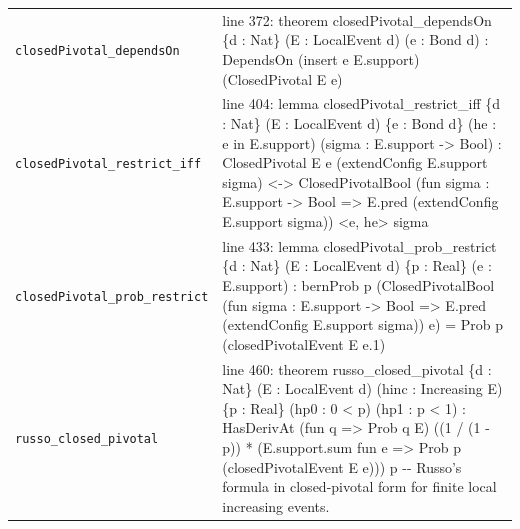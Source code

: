 \documentclass[10pt]{article}
\begin{document}
\begin{longtable}{>{\raggedright\arraybackslash}p{} >{\raggedright\arraybackslash}p{}}
\texttt{closedPivotal\_\allowbreak{}dependsOn} & {\ttfamily\scriptsize line 372:\allowbreak{} theorem closedPivotal\_\allowbreak{}dependsOn \{d :\allowbreak{} Nat\} (\allowbreak{}E :\allowbreak{} LocalEvent d)\allowbreak{} (\allowbreak{}e :\allowbreak{} Bond d)\allowbreak{} :\allowbreak{} DependsOn (\allowbreak{}insert e E.\allowbreak{}support)\allowbreak{} (\allowbreak{}ClosedPivotal E e)\allowbreak{}} \\[0.45em]
\texttt{closedPivotal\_\allowbreak{}restrict\_\allowbreak{}iff} & {\ttfamily\scriptsize line 404:\allowbreak{} lemma closedPivotal\_\allowbreak{}restrict\_\allowbreak{}iff \{d :\allowbreak{} Nat\} (\allowbreak{}E :\allowbreak{} LocalEvent d)\allowbreak{} \{e :\allowbreak{} Bond d\} (\allowbreak{}he :\allowbreak{} e in E.\allowbreak{}support)\allowbreak{} (\allowbreak{}sigma :\allowbreak{} E.\allowbreak{}support -\allowbreak{}> Bool)\allowbreak{} :\allowbreak{} ClosedPivotal E e (\allowbreak{}extendConfig E.\allowbreak{}support sigma)\allowbreak{} <-\allowbreak{}> ClosedPivotalBool (\allowbreak{}fun sigma :\allowbreak{} E.\allowbreak{}support -\allowbreak{}> Bool =\allowbreak{}> E.\allowbreak{}pred (\allowbreak{}extendConfig E.\allowbreak{}support sigma)\allowbreak{})\allowbreak{} <e,\allowbreak{} he> sigma} \\[0.45em]
\texttt{closedPivotal\_\allowbreak{}prob\_\allowbreak{}restrict} & {\ttfamily\scriptsize line 433:\allowbreak{} lemma closedPivotal\_\allowbreak{}prob\_\allowbreak{}restrict \{d :\allowbreak{} Nat\} (\allowbreak{}E :\allowbreak{} LocalEvent d)\allowbreak{} \{p :\allowbreak{} Real\} (\allowbreak{}e :\allowbreak{} E.\allowbreak{}support)\allowbreak{} :\allowbreak{} bernProb p (\allowbreak{}ClosedPivotalBool (\allowbreak{}fun sigma :\allowbreak{} E.\allowbreak{}support -\allowbreak{}> Bool =\allowbreak{}> E.\allowbreak{}pred (\allowbreak{}extendConfig E.\allowbreak{}support sigma)\allowbreak{})\allowbreak{} e)\allowbreak{} =\allowbreak{} Prob p (\allowbreak{}closedPivotalEvent E e.\allowbreak{}1)\allowbreak{}} \\[0.45em]
\texttt{russo\_\allowbreak{}closed\_\allowbreak{}pivotal} & {\ttfamily\scriptsize line 460:\allowbreak{} theorem russo\_\allowbreak{}closed\_\allowbreak{}pivotal \{d :\allowbreak{} Nat\} (\allowbreak{}E :\allowbreak{} LocalEvent d)\allowbreak{} (\allowbreak{}hinc :\allowbreak{} Increasing E)\allowbreak{} \{p :\allowbreak{} Real\} (\allowbreak{}hp0 :\allowbreak{} 0 < p)\allowbreak{} (\allowbreak{}hp1 :\allowbreak{} p < 1)\allowbreak{} :\allowbreak{} HasDerivAt (\allowbreak{}fun q =\allowbreak{}> Prob q E)\allowbreak{} (\allowbreak{}(\allowbreak{}1 /\allowbreak{} (\allowbreak{}1 -\allowbreak{} p)\allowbreak{})\allowbreak{} *\allowbreak{} (\allowbreak{}E.\allowbreak{}support.\allowbreak{}sum fun e =\allowbreak{}> Prob p (\allowbreak{}closedPivotalEvent E e)\allowbreak{})\allowbreak{})\allowbreak{} p -\allowbreak{}-\allowbreak{} Russo's formula in closed-\allowbreak{}pivotal form for finite local increasing events.\allowbreak{}} \\[0.45em]
\end{longtable}
\end{document}
